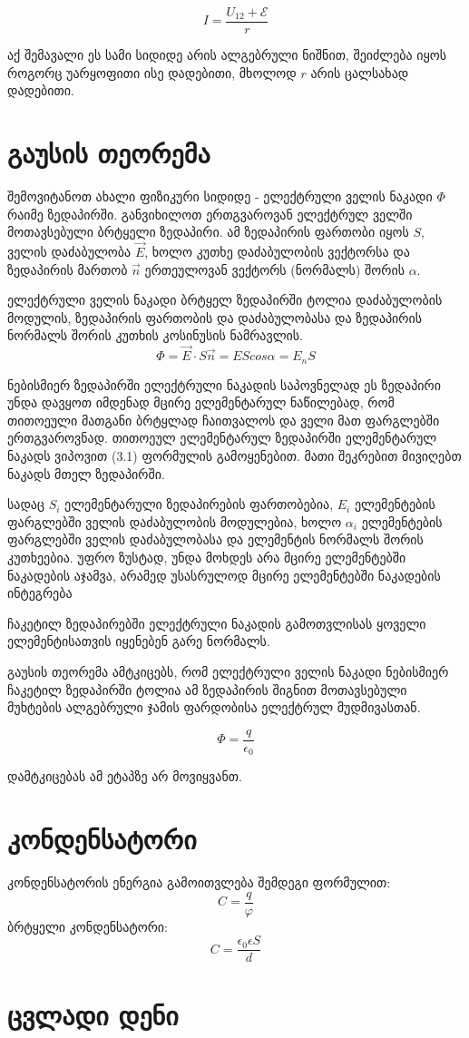\documentclass{book}
\begin{document}
$$I = \frac{U_{12} + \mathcal{E}}{r}$$

აქ შემავალი ეს სამი სიდიდე არის ალგებრული ნიშნით, შეიძლება იყოს როგორც უარყოფითი ისე დადებითი, მხოლოდ $r$ არის ცალსახად დადებითი.
\section{გაუსის თეორემა}
შემოვიტანოთ ახალი ფიზიკური სიდიდე - ელექტრული ველის ნაკადი $\Phi$ რაიმე ზედაპირში. განვიხილოთ ერთგვაროვან ელექტრულ ველში მოთავსებული ბრტყელი ზედაპირი. ამ ზედაპირის ფართობი იყოს $S$, ველის დაძაბულობა $\vec{E}$, ხოლო კუთხე დაძაბულობის ვექტორსა და ზედაპირის მართობ $\vec{n}$ ერთეულოვან ვექტორს (ნორმალს) შორის $\alpha$.

ელექტრული ველის ნაკადი ბრტყელ ზედაპირში ტოლია დაძაბულობის მოდულის, ზედაპირის ფართობის და დაძაბულობასა და ზედაპირის ნორმალს შორის კუთხის კოსინუსის ნამრავლის.
	$$\Phi = \vec{E}\cdot S\vec{n}=EScos\alpha=E_n S$$

ნებისმიერ ზედაპირში ელექტრული ნაკადის საპოვნელად ეს ზედაპირი უნდა დავყოთ იმდენად მცირე ელემენტარულ ნაწილებად, რომ თითოეული მათგანი ბრტყლად ჩაითვალოს და ველი მათ ფარგლებში ერთგვაროვნად. თითოეულ ელემენტარულ ზედაპირში ელემენტარულ ნაკადს ვიპოვით (3.1) ფორმულის გამოყენებით. მათი შეკრებით მივიღებთ ნაკადს მთელ ზედაპირში.

სადაც $S_i$ ელემენტარული ზედაპირების ფართობებია, $E_i$ ელემენტების ფარგლებში ველის დაძაბულობის მოდულებია, ხოლო $\alpha_i$ ელემენტების ფარგლებში ველის დაძაბულობასა და ელემენტის ნორმალს შორის კუთხეებია. უფრო ზუსტად, უნდა მოხდეს არა მცირე ელემენტებში ნაკადების აჯამვა, არამედ უსასრულოდ მცირე ელემენტებში ნაკადების ინტეგრება

ჩაკეტილ ზედაპირებში ელექტრული ნაკადის გამოთვლისას ყოველი
ელემენტისათვის იყენებენ გარე ნორმალს.
 
გაუსის თეორემა ამტკიცებს, რომ ელექტრული ველის ნაკადი ნებისმიერ ჩაკეტილ ზედაპირში ტოლია ამ ზედაპირის შიგნით მოთავსებული მუხტების ალგებრული ჯამის ფარდობისა ელექტრულ მუდმივასთან.

$$\Phi = \frac{q}{\epsilon_0}$$

დამტკიცებას ამ ეტაპზე არ მოვიყვანთ.
\section{კონდენსატორი}
კონდენსატორის ენერგია გამოითვლება შემდეგი ფორმულით:
$$C = \frac{q}{\varphi}$$
ბრტყელი კონდენსატორი:
$$C = \frac{\epsilon_0 \epsilon S}{d}$$

\section{ცვლადი დენი}
\end{document}
